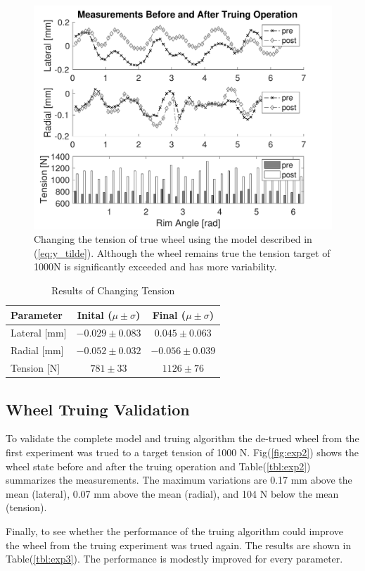 \documentclass[journal]{IEEEtran}
\begin{document}
\begin{figure}[!t]
\centering
\includegraphics[width=3.25 in]{./figs/exp_cnst_shift} %
\caption{Changing the tension of true wheel using the model described in (\ref{eq:y_tilde}).  Although the wheel remains true the tension target of 1000N is significantly exceeded and has more variability. }
\label{fig:exp_cnst_shift}
\end{figure}

\begin{table}[!t]
\caption{Results of Changing Tension}
\label{tbl:const_shift}
\centering
\begin{tabular}{| l | c | c |}
    \hline
    Parameter & Inital ($\mu \pm \sigma$) & Final ($\mu \pm \sigma$)\\ \hline
    Lateral [mm] & $-0.029\pm0.083$ &$0.045\pm 0.063$ \\ \hline 
    Radial [mm] &$-0.052\pm0.032$& $-0.056\pm0.039$ \\ \hline 
    Tension [N] &$781\pm33$& $1126\pm76$ \\ \hline 
\end{tabular}
\end{table}

\subsection{Wheel Truing Validation}
To validate the complete model and truing algorithm the de-trued wheel from the first experiment was trued to a target tension of 1000 N. Fig(\ref{fig:exp2}) shows the wheel state before and after the truing operation and Table(\ref{tbl:exp2}) summarizes the measurements. The maximum variations are 0.17 mm above the mean (lateral), 0.07 mm above the mean (radial), and 104 N below the mean (tension). 

Finally, to see whether the performance of the truing algorithm could improve the wheel from the truing experiment was trued again.  The results are shown in Table(\ref{tbl:exp3}). The performance is modestly improved for every parameter.
\end{document}
